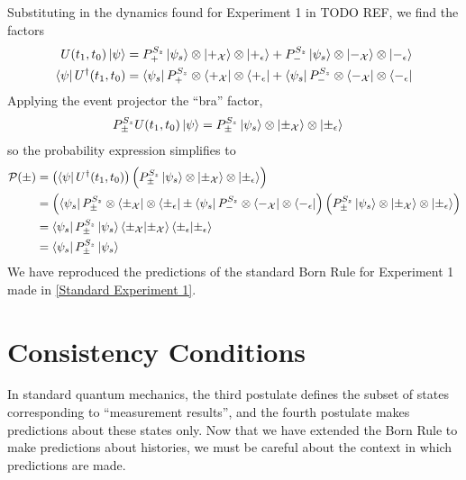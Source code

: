 Substituting in the dynamics found for Experiment 1 in TODO REF, we find the factors
\begin{align}
  U(t_1, t_0) \ket{\psi} &= P^{S_z}_+ \ket{\psi_s} \otimes \ket{+_\mathcal{X}} \otimes \ket{+_\epsilon} + P^{S_z}_- \ket{\psi_s} \otimes \ket{-_\mathcal{X}} \otimes \ket{-_\epsilon} \\ \nonumber
  \bra{\psi} U^\dagger(t_1, t_0) &= \bra{\psi_s}P^{S_z}_+ \otimes \bra{+_\mathcal{X}} \otimes \bra{+_\epsilon} + \bra{\psi_s}P^{S_z}_- \otimes \bra{-_\mathcal{X}} \otimes \bra{-_\epsilon}
\end{align}
Applying the event projector the ``bra'' factor,
\begin{align}
  P^{S_z}_\pm U(t_1, t_0) \ket{\psi} &= P^{S_z}_\pm \ket{\psi_s} \otimes \ket{\pm_\mathcal{X}} \otimes \ket{\pm_\epsilon}
\end{align}
so the probability expression simplifies to
\begin{align} \label{eq:reproducing born rule}
  \mathcal{P}(\pm) &= \left(\bra{\psi}  U^\dagger(t_1, t_0)\right) \left( P^{S_z}_\pm \ket{\psi_s} \otimes \ket{\pm_\mathcal{X}} \otimes \ket{\pm_\epsilon}\right) \\ \nonumber
   &= \left(\bra{\psi_s}P^{S_z}_\pm \otimes \bra{\pm_\mathcal{X}} \otimes \bra{\pm_\epsilon} \pm \bra{\psi_s}P^{S_z}_- \otimes \bra{-_\mathcal{X}} \otimes \bra{-_\epsilon} \right) \left( P^{S_z}_\pm \ket{\psi_s} \otimes \ket{\pm_\mathcal{X}} \otimes \ket{\pm_\epsilon}\right) \\ \nonumber
   &= \bra{\psi_s} P^{S_z}_\pm \ket{\psi_s} \braket{\pm_\mathcal{X}|\pm_\mathcal{X}} \braket{\pm_\epsilon|\pm_\epsilon} \\ \nonumber
   &= \bra{\psi_s} P^{S_z}_\pm \ket{\psi_s}
\end{align}
We have reproduced the predictions of the standard Born Rule for Experiment 1 made in \autoref{Standard Experiment 1}.

\section{Consistency Conditions}

In standard quantum mechanics, the third postulate defines the subset of states corresponding to ``measurement results'', and the fourth postulate makes predictions about these states only. Now that we have extended the Born Rule to make predictions about histories, we must be careful about the context in which predictions are made.

